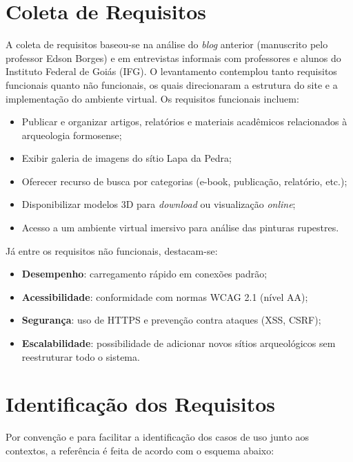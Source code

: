 \section{Coleta de Requisitos}
\label{sec:coleta_requisitos}

A coleta de requisitos baseou-se na análise do \textit{blog} anterior (manuscrito pelo professor Edson Borges) e em entrevistas informais com professores e alunos do Instituto Federal de Goiás (IFG). O levantamento contemplou tanto requisitos funcionais quanto não funcionais, os quais direcionaram a estrutura do site e a implementação do ambiente virtual. Os requisitos funcionais incluem:

\begin{itemize}
    \item Publicar e organizar artigos, relatórios e materiais acadêmicos relacionados à arqueologia formosense;
    \item Exibir galeria de imagens do sítio Lapa da Pedra;
    \item Oferecer recurso de busca por categorias (e-book, publicação, relatório, etc.);
    \item Disponibilizar modelos 3D para \textit{download} ou visualização \textit{online};
    \item Acesso a um ambiente virtual imersivo para análise das pinturas rupestres.
\end{itemize}

Já entre os requisitos não funcionais, destacam-se:
\begin{itemize}
    \item \textbf{Desempenho}: carregamento rápido em conexões padrão;
    \item \textbf{Acessibilidade}: conformidade com normas WCAG 2.1 (nível AA);
    \item \textbf{Segurança}: uso de HTTPS e prevenção contra ataques (XSS, CSRF);
    \item \textbf{Escalabilidade}: possibilidade de adicionar novos sítios arqueológicos sem reestruturar todo o sistema.
\end{itemize}

\section{Identificação dos Requisitos}
\label{sec:identificacao_requisitos}

Por convenção e para facilitar a identificação dos casos de uso junto aos contextos, a referência é feita de acordo com o esquema abaixo:

